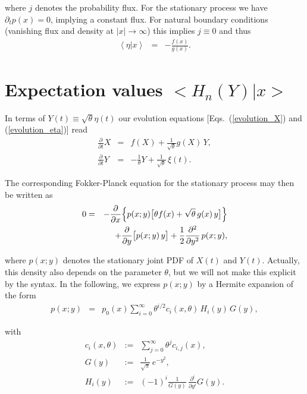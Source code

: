 \documentclass[aps,twocolumn,superscriptaddress,showpacs,showkeys]{revtex4}
\newcommand{\p}{\partial}
\newcommand{\fracpp}[1]{\frac{\p}{\p#1}}
\begin{document}
{\noindent where $j$ denotes the probability flux. For the stationary process we have $\p_t p(x)=0$, implying
a constant flux. For natural boundary conditions (vanishing flux and density at $|x|\to\infty$) this implies
$j\equiv 0$ and thus
%
\begin{eqnarray}
\left<\eta|x\right> &=& -\frac{f(x)}{g(x)}.
\end{eqnarray}

\section{Expectation values $\big<H_n(Y)|x\big>$}
\label{app_expectation_Hn}

\noindent In terms of $Y(t)\equiv\sqrt{\theta}\eta(t)$ our evolution equations [Eqs.~(\ref{evolution_X}) and
(\ref{evolution_eta})] read
%
\begin{eqnarray}
\fracpp{t} X &=& f(X) +\frac{1}{\sqrt{\theta}}g(X)\,Y,\\
\fracpp{t} Y &=& -\frac{1}{\theta} Y+\frac{1}{\sqrt{\theta}}\,\xi(t).
\end{eqnarray}

\noindent The corresponding Fokker-Planck equation for the stationary process may then be written as
%
\begin{eqnarray}\label{def_FokkerPlanck_XY}
0 &=& -\fracpp{x}\Big\{p(x;y)\big[\theta f(x)+\sqrt{\theta}\, g(x)\,y\big]\Big\}\cr
  &&  +\fracpp{y}\big[p(x;y)\,y\big] +\frac{1}{2}\frac{\p^2}{\p y^2}\,p(x;y),
\end{eqnarray}

\noindent where $p(x;y)$ denotes the stationary joint PDF of $X(t)$ and $Y(t)$. Actually, this density also depends
on the parameter $\theta$, but we will not make this explicit by the syntax. In the following, we express
$p(x;y)$ by a Hermite expansion of the form
%
\begin{eqnarray}\label{def_expansion}
p(x;y) &=& p_0(x)\sum_{i=0}^\infty \theta^{i/2} c_i(x,\theta)\, H_i(y)\, G(y),
\end{eqnarray}

\noindent with
%
\begin{eqnarray}
\label{def_c_i}
c_i(x,\theta) &:=& \sum_{j=0}^\infty \theta^j c_{i,j}(x),\\
G(y) &:=& \frac{1}{\sqrt{\pi}}\,e^{-y^2},\\
H_i(y) &:=& (-1)^i\frac{1}{G(y)}\, \frac{\p^i}{\p y^i} G(y).
\end{eqnarray}

}
\end{document}
